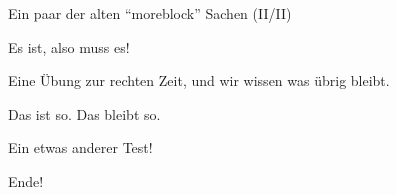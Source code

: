 \documentclass[
  ignorenonframetext,
]{beamer}
\begin{document}
\begin{frame}{Ein paar der alten ``moreblock'' Sachen (II/II)}
\protect\hypertarget{ein-paar-der-alten-moreblock-sachen-iiii}{}


\begin{definition}

Es ist, also muss es!

\end{definition}


\begin{Uebung}

Eine Übung zur rechten Zeit, und wir wissen was übrig bleibt.

\end{Uebung}


\begin{Fakt}

Das ist so. Das bleibt so.

\end{Fakt}


\begin{Beispiel}[\(<\) \(>\) \(\leq\)]

Ein etwas anderer Test!

\end{Beispiel}

\end{frame}

\begin{frame}{Ende!}
\protect\hypertarget{ende}{}

\end{frame}
\end{document}
